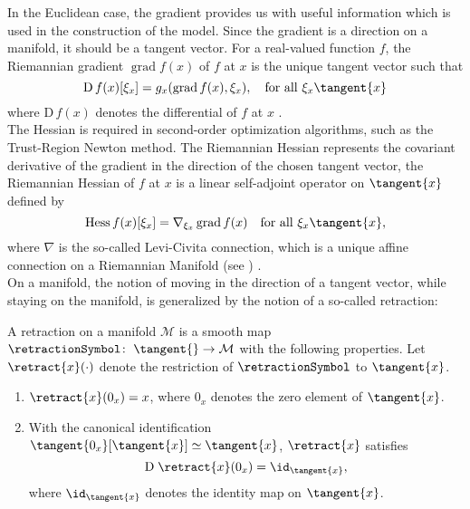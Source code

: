 In the Euclidean case, the gradient provides us with useful information which is used in the construction of the model. Since the gradient is a direction on a manifold, it should be a tangent vector. For a real-valued function $f$, the Riemannian gradient $\operatorname{grad} f(x)$ of $f$ at $x$ is the unique tangent vector such that
\begin{equation*}
    \mathrm{D} \, f(x) [\xi_x] = g_x (\operatorname{grad} f(x), \xi_x), \quad \text{for all } \xi_x \tangent{x}
\end{equation*}
where $\mathrm{D} \, f(x)$ denotes the differential of $f$ at $x$ \cite[p.~46]{AbsilMahonySepulchre:2008}. \\
The Hessian is required in second-order optimization algorithms, such as the Trust-Region Newton method. The Riemannian Hessian represents the covariant derivative of the gradient in the direction of the chosen tangent vector, the Riemannian Hessian of $f$ at $x$ is a linear self-adjoint operator on $\tangent{x}$ defined by
\begin{equation*}
    \operatorname{Hess} f(x) [\xi_{x}] = \nabla_{\xi_{x}} \operatorname{grad} f(x) \quad \text{for all } \xi_x \tangent{x},
\end{equation*}
where $\nabla$ is the so-called Levi-Civita connection, which is a unique affine connection on a Riemannian Manifold (see \cite[Theorem~5.3.1~(Levi-Civita)]{AbsilMahonySepulchre:2008}) \cite[p.~105]{AbsilMahonySepulchre:2008}. \\ 
On a manifold, the notion of moving in the direction of a tangent vector, while staying on the manifold, is generalized by the notion of a so-called retraction:

\begin{definition}\label{Retraction}
    A retraction on a manifold $\mathcal{M}$ is a smooth map $\retractionSymbol \colon \; \tangent{} \to \mathcal{M}$ with the following properties. Let $\retract{x}(\cdot)$ denote the restriction of $\retractionSymbol$ to $\tangent{x}$. 
    \begin{enumerate}
        \item $\retract{x}(0_x) = x$, where $0_x$ denotes the zero element of $\tangent{x}$. 
        \item With the canonical identification $\tangent{0_x}[\tangent{x}] \simeq \tangent{x}$, $\retract{x}$ satisfies \begin{equation} \mathrm{D} \; \retract{x}(0_x) = \id_{\tangent{x}}, \label{LocalRigidity} \end{equation} where $\id_{\tangent{x}}$ denotes the identity map on $\tangent{x}$.  
    \end{enumerate}
\end{definition}

